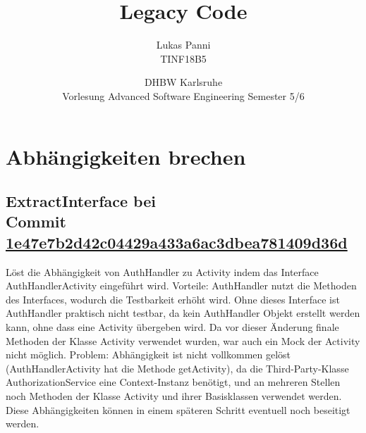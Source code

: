 \documentclass[12pt]{article}
\title{Legacy Code}
\date{DHBW Karlsruhe\\ Vorlesung Advanced Software Engineering Semester 5/6}
\author{Lukas Panni \\ TINF18B5}
\begin{document}
\maketitle

\newpage

\section{Abhängigkeiten brechen}

\subsection[ExtractInterface bei Commit \href{https://github.com/lukaspanni/OpenSourceStats/commit/1e47e7b2d42c04429a433a6ac3dbea781409d36d} {1e47e7b2d42c04429a433a6ac3dbea781409d36d}]{\texorpdfstring{ExtractInterface bei\\ Commit \href{https://github.com/lukaspanni/OpenSourceStats/commit/1e47e7b2d42c04429a433a6ac3dbea781409d36d} {1e47e7b2d42c04429a433a6ac3dbea781409d36d}}{ExtractInterface bei Commit \href{https://github.com/lukaspanni/OpenSourceStats/commit/1e47e7b2d42c04429a433a6ac3dbea781409d36d} {1e47e7b2d42c04429a433a6ac3dbea781409d36d}}}


Löst die Abhängigkeit von AuthHandler zu Activity indem das Interface AuthHandlerActivity eingeführt wird.
Vorteile: AuthHandler nutzt die Methoden des Interfaces, wodurch die Testbarkeit erhöht wird. Ohne dieses Interface ist AuthHandler praktisch nicht testbar, da kein AuthHandler Objekt erstellt werden kann, ohne dass eine Activity übergeben wird. Da vor dieser Änderung finale Methoden der Klasse Activity verwendet wurden, war auch ein Mock der Activity nicht möglich.
Problem: Abhängigkeit ist nicht vollkommen gelöst (AuthHandlerActivity hat die Methode getActivity), da die Third-Party-Klasse AuthorizationService eine Context-Instanz benötigt, und an mehreren Stellen noch Methoden der Klasse Activity und ihrer Basisklassen verwendet werden. Diese Abhängigkeiten können in einem späteren Schritt eventuell noch beseitigt werden.
\end{document}
